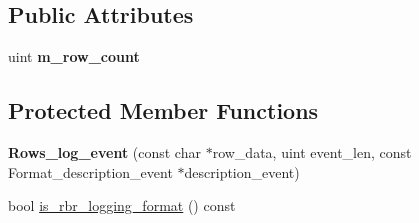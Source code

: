 \subsection*{Public Attributes}
\begin{DoxyCompactItemize}
\item 
\mbox{\label{classRows__log__event_a8f48d1dce18aa49d9b71e9e1a296bbbe}} 
uint {\bfseries m\+\_\+row\+\_\+count}
\end{DoxyCompactItemize}
\subsection*{Protected Member Functions}
\begin{DoxyCompactItemize}
\item 
\mbox{\label{classRows__log__event_a6c1c863fd13866639c1a4c37fd41e6b2}} 
{\bfseries Rows\+\_\+log\+\_\+event} (const char $\ast$row\+\_\+data, uint event\+\_\+len, const Format\+\_\+description\+\_\+event $\ast$description\+\_\+event)
\item 
bool \mbox{\hyperlink{classRows__log__event_a6e9443d09dd4aad9e689f962ba29abfd}{is\+\_\+rbr\+\_\+logging\+\_\+format}} () const
\end{DoxyCompactItemize}
